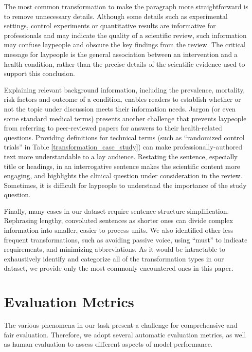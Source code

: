 \documentclass[letterpaper, table]{article} %
\begin{document}
The most common transformation to make the paragraph more straightforward is to remove unnecessary details. Although some details such as experimental settings, control experiments or quantitative results are informative for professionals and may indicate the quality of a scientific review, such information
may confuse laypeople and obscure the key findings from the review.
The critical message for laypeople is the general association between an intervention and a health condition, rather than the precise details of the scientific evidence used to support this conclusion.

Explaining relevant background information, including the prevalence, mortality, risk factors and outcome of a condition, enables readers to establish whether or not the topic under discussion meets their information needs. Jargon (or even some standard medical terms) presents another challenge that prevents laypeople from referring to peer-reviewed papers for answers to their health-related questions. Providing definitions for technical terms (such as ``randomized control trials'' in Table \ref{transformation_case_study}) can make professionally-authored text more understandable to a lay audience. Restating the sentence, especially title or headings, in an interrogative sentence makes the scientific content more engaging, and highlights the clinical question under consideration in the review. Sometimes, it is difficult for laypeople to understand the importance of the study question.

Finally, many cases in our dataset require sentence structure simplification. Rephrasing lengthy, convoluted sentences as shorter ones can divide complex information into smaller, easier-to-process units. We also identified other less frequent transformations, such as avoiding passive voice, using ``must'' to indicate requirements, and minimizing abbreviations. As it would be intractable to exhaustively identify and categorize all of the transformation types in our dataset, we provide only the most commonly encountered ones in this paper.




\section{Evaluation Metrics}
\label{evaluation_metrics}

The various phenomena in our task present a challenge for comprehensive and fair evaluation. Therefore, we adopt several automatic evaluation metrics, as well as human evaluation to assess different aspects of model performance. %
\end{document}
